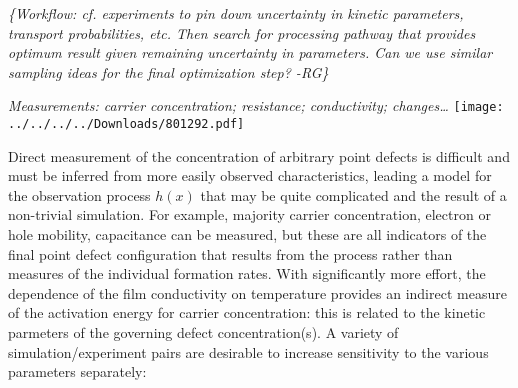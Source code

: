 \documentclass[11pt]{article}
\newcommand{\remrg}[1]{ {\it \color{drkgrn} \{#1 -RG\}}}
\begin{document}
\remrg{Workflow: cf. experiments to pin down uncertainty in kinetic
parameters, transport probabilities, etc. Then search for processing
pathway that provides optimum result given remaining uncertainty in
parameters. Can we use similar sampling ideas for the final
  optimization step?}

\emph{Measurements: carrier concentration; resistance; conductivity;
  changes\ldots}
\texttt{[image: ../../../../Downloads/801292.pdf]}


%


Direct measurement of the concentration of arbitrary point defects is
difficult and must be inferred from more easily observed
characteristics, leading a model for the observation process $h(x)$
that may be quite complicated and the result of a non-trivial
simulation.  For example, majority carrier concentration, electron or
hole mobility, capacitance can be measured, but these are all
indicators of the final point defect configuration that results from
the process rather than measures of the individual formation
rates. With significantly more effort, the dependence of the film
conductivity on temperature provides an indirect measure of the
activation energy for carrier concentration: this is related to the
kinetic parmeters of the governing defect concentration(s).  A variety
of simulation/experiment pairs are desirable to increase sensitivity
to the various parameters separately:

\end{document}
